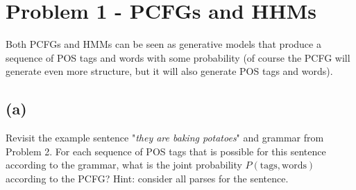 \documentclass[twoside,11pt]{homework}
\date{\today} %
\begin{document}
\maketitle

\section*{Problem 1 - PCFGs and HHMs}
Both PCFGs and HMMs can be seen as generative models that produce a sequence of
POS tags and words with some probability (of course the PCFG will generate even
more structure, but it will also generate POS tags and words).

\subsection*{(a)}
\begin{prob}
  Revisit the example sentence "\textit{they are baking potatoes}" and grammar from
  Problem 2.
  For each sequence of POS tags that is possible for this sentence according to
  the grammar, what is the joint probability $P(\text{tags}, \text{words})$
  according to the PCFG?
  Hint: consider all parses for the sentence.
\end{prob}
\end{document}
